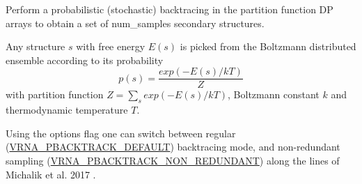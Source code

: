 Perform a probabilistic (stochastic) backtracing in the partition function DP arrays to obtain a set of {\ttfamily num\+\_\+samples} secondary structures.

Any structure $ s $ with free energy $ E(s) $ is picked from the Boltzmann distributed ensemble according to its probability \[ p(s) = \frac{exp(-E(s) / kT)}{Z} \] with partition function $ Z = \sum_s exp(-E(s) / kT) $, Boltzmann constant $ k $ and thermodynamic temperature $ T $.

Using the {\ttfamily options} flag one can switch between regular (\mbox{\hyperlink{group__subopt__stochbt_ga760aa2fb2d5e3d7521a11454a21e9b9f}{V\+R\+N\+A\+\_\+\+P\+B\+A\+C\+K\+T\+R\+A\+C\+K\+\_\+\+D\+E\+F\+A\+U\+LT}}) backtracing mode, and non-\/redundant sampling (\mbox{\hyperlink{group__subopt__stochbt_ga9d580ce645aa0c38b69afdf56c332200}{V\+R\+N\+A\+\_\+\+P\+B\+A\+C\+K\+T\+R\+A\+C\+K\+\_\+\+N\+O\+N\+\_\+\+R\+E\+D\+U\+N\+D\+A\+NT}}) along the lines of Michalik et al. 2017 \cite{michalik:2017}.

